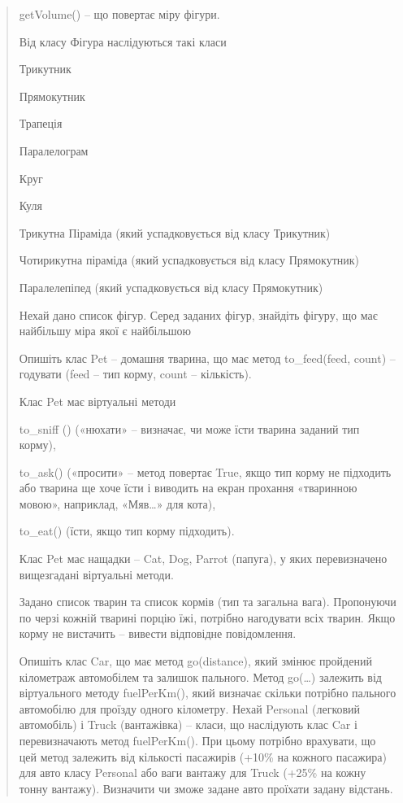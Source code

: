 \documentclass[]{article}
\begin{document}
\begin{quote}
getVolume() -- що повертає міру фігури.

Від класу Фігура наслідуються такі класи

Трикутник

Прямокутник

Трапеція

Паралелограм

Круг

Куля

Трикутна Піраміда (який успадковується від класу Трикутник)

Чотирикутна піраміда (який успадковується від класу Прямокутник)

Паралелепіпед (який успадковується від класу Прямокутник)

Нехай дано список фігур. Серед заданих фігур, знайдіть фігуру, що має
найбільшу міра якої є найбільшою

Опишіть клас Pet -- домашня тварина, що має метод to\_feed(feed, count)
-- годувати (feed -- тип корму, count -- кількість).

Клас Pet має віртуальні методи

to\_sniff () («нюхати» -- визначає, чи може їсти тварина заданий тип
корму),

to\_ask() («просити» -- метод повертає True, якщо тип корму не підходить
або тварина ще хоче їсти і виводить на екран прохання «тваринною мовою»,
наприклад, «Мяв\ldots{}» для кота),

to\_eat() (їсти, якщо тип корму підходить).

Клас Pet має нащадки -- Cat, Dog, Parrot (папуга), у яких перевизначено
вищезгадані віртуальні методи.

Задано список тварин та список кормів (тип та загальна вага). Пропонуючи
по черзі кожній тварині порцію їжі, потрібно нагодувати всіх тварин.
Якщо корму не вистачить -- вивести відповідне повідомлення.

Опишіть клас Car, що має метод go(distance), який змінює пройдений
кілометраж автомобілем та залишок пального. Метод go(\ldots{}) залежить
від віртуального методу fuelPerKm(), який визначає скільки потрібно
пального автомобілю для проїзду одного кілометру. Нехай Personal
(легковий автомобіль) і Truck (вантажівка) -- класи, що наслідують клас
Car і перевизначають метод fuelPerKm(). При цьому потрібно врахувати, що
цей метод залежить від кількості пасажирів (+10\% на кожного пасажира)
для авто класу Personal або ваги вантажу для Truck (+25\% на кожну тонну
вантажу). Визначити чи зможе задане авто проїхати задану відстань.


\end{quote}
\end{document}
